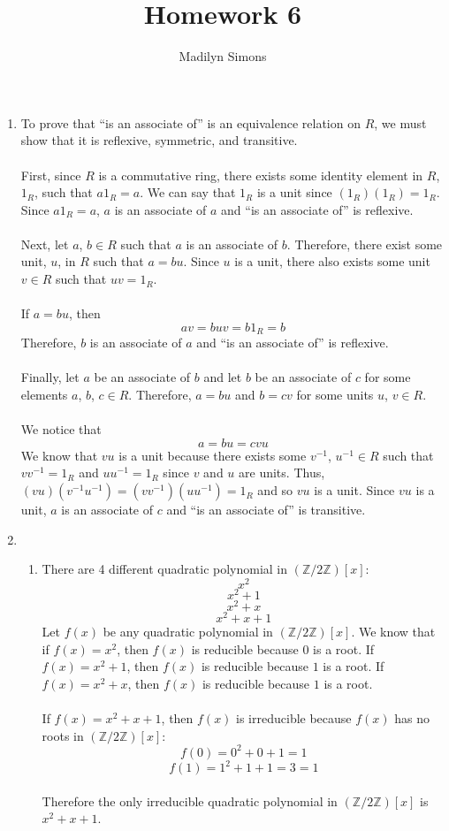 \documentclass{article}
\title{Homework 6}
\author{Madilyn Simons}
\date{}
\newcommand{\Z}{\mathbb{Z}}
\begin{document}
\maketitle

\begin{enumerate}

\item To prove that ``is an associate of'' is an equivalence relation on $R$, we
must show that it is reflexive, symmetric, and transitive.
\\
\\
First, since $R$ is a commutative ring, there exists some identity element in
$R$, $1_R$, such that $a1_R = a$.  We can say that $1_R$ is a unit since
$(1_{R})  (1_{R}) = 1_{R}$.  Since $a1_R = a$, $a$ is an associate of $a$
and ``is an associate of'' is reflexive.
\\
\\
Next, let $a$, $b \in R$ such that $a$ is an associate of $b$.  Therefore,
there exist some unit, $u$, in $R$ such that $a = bu$.  Since $u$ is a unit,
there also exists some unit $v \in R$ such that $uv = 1_R$.
\\
\\
If $a = bu$, then
\[
av = buv = b1_{R} = b
\]
Therefore, $b$ is an associate of $a$ and ``is an associate of'' is reflexive.
\\
\\
Finally, let $a$ be an associate of $b$ and let $b$ be an associate of $c$ for
some elements $a$, $b$, $c \in R$.  Therefore, $a = bu$ and $b = cv$ for some
units $u$, $v \in R$.
\\
\\
We notice that
\[
a = bu = cvu
\]
We know that $vu$ is a unit because there exists some
$v^{-1}$, $u^{-1} \in R$ such that $vv^{-1} = 1_R$ and $uu^{-1} = 1_R$ since
$v$ and $u$ are units.  Thus, $(vu)(v^{-1}u^{-1}) = (vv^{-1})(uu^{-1}) = 1_R$
and so $vu$ is a unit.  Since $vu$ is a unit, $a$ is an associate of $c$ and
``is an associate of'' is transitive.

\item
\begin{enumerate}
\item There are 4 different quadratic polynomial in $(\Z/2\Z)[x]$:
\[
x^2
\] \[
x^2 + 1
\] \[
x^2 + x
\] \[
x^2 + x + 1
\]
Let $f(x)$ be any quadratic polynomial in $(\Z/2\Z)[x]$.  We know that
if $f(x) = x^2$, then $f(x)$ is reducible because $0$ is a root.
If $f(x) = x^2 + 1$, then $f(x)$ is reducible because $1$ is a root.
If $f(x) = x^2 + x$, then $f(x)$ is reducible because $1$ is a root.
\\ \\
If $f(x) = x^2 + x + 1$, then $f(x)$ is irreducible because $f(x)$ has no roots
in $(\Z/2\Z)[x]$:
\[
f(0) = 0^2 + 0 + 1 = 1
\] \[
f(1) = 1^2 + 1 + 1 = 3 = 1
\]
\\
Therefore the only irreducible quadratic polynomial in $(\Z/2\Z)[x]$ is
$x^2 + x + 1$.


\end{enumerate}
\end{enumerate}
\end{document}
